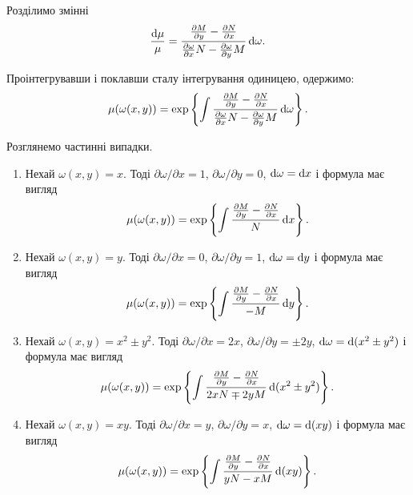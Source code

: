 Розділимо змінні
\begin{equation*}
	\frac{\mathop{}\!\mathrm{d} \mu}{\mu} = \frac{\frac{\partial M}{\partial y} - \frac{\partial N}{\partial x} }{\frac{\partial \omega}{\partial x} N - \frac{\partial \omega}{\partial y} M} \mathop{}\!\mathrm{d} \omega.
\end{equation*}

Проінтегрувавши і поклавши сталу інтегрування одиницею, одержимо:
\begin{equation*}
	\mu(\omega(x,y)) = \exp\left\{\int \frac{\frac{\partial M}{\partial y} - \frac{\partial N}{\partial x} }{\frac{\partial \omega}{\partial x} N - \frac{\partial \omega}{\partial y} M} \mathop{}\!\mathrm{d} \omega\right\}.
\end{equation*}

Розглянемо частинні випадки.
\begin{enumerate}
	\item Нехай $\omega(x, y) = x$. Тоді $\partial \omega / \partial x = 1$, $\partial \omega / \partial y = 0$, $\mathop{}\!\mathrm{d} \omega = \mathop{}\!\mathrm{d} x$ і формула має вигляд
	\begin{equation*}
		\mu(\omega(x,y)) = \exp\left\{\int \frac{\frac{\partial M}{\partial y} - \frac{\partial N}{\partial x} }{N} \mathop{}\!\mathrm{d} x\right\}.
	\end{equation*}	

	\item Нехай $\omega(x, y) = y$. Тоді $\partial \omega / \partial x = 0$, $\partial \omega / \partial y = 1$, $\mathop{}\!\mathrm{d} \omega = \mathop{}\!\mathrm{d} y$ і формула має вигляд
	\begin{equation*}
		\mu(\omega(x,y)) = \exp\left\{\int \frac{\frac{\partial M}{\partial y} - \frac{\partial N}{\partial x} }{-M} \mathop{}\!\mathrm{d} y\right\}.
	\end{equation*}

	\item Нехай $\omega(x, y) = x^2 \pm y^2$. Тоді $\partial \omega / \partial x = 2 x$, $\partial \omega / \partial y = \pm 2y$, $\mathop{}\!\mathrm{d} \omega = \mathop{}\!\mathrm{d} (x^2 \pm y^2)$ і формула має вигляд
	\begin{equation*}
		\mu(\omega(x,y)) = \exp\left\{\int \frac{\frac{\partial M}{\partial y} - \frac{\partial N}{\partial x} }{2 x N \mp 2 y M} \mathop{}\!\mathrm{d} (x^2 \pm y^2)\right\}.
	\end{equation*}

	\item Нехай $\omega(x, y) = x y$. Тоді $\partial \omega / \partial x = y$, $\partial \omega / \partial y = x$, $\mathop{}\!\mathrm{d} \omega = \mathop{}\!\mathrm{d} (xy)$ і формула має вигляд
	\begin{equation*}
		\mu(\omega(x,y)) = \exp\left\{\int \frac{\frac{\partial M}{\partial y} - \frac{\partial N}{\partial x} }{yN-xM} \mathop{}\!\mathrm{d} (xy)\right\}.
	\end{equation*}
\end{enumerate}
